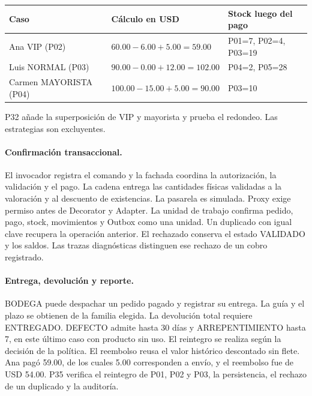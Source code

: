 \begin{center}\small
\begin{tabular}{@{}L{.22\linewidth}L{.42\linewidth}L{.30\linewidth}@{}}\toprule
Caso & Cálculo en USD & Stock luego del pago\\\midrule
Ana VIP (P02) & $60.00-6.00+5.00=59.00$ & P01=7, P02=4, P03=19\\
Luis NORMAL (P03) & $90.00-0.00+12.00=102.00$ & P04=2, P05=28\\
Carmen MAYORISTA (P04) & $100.00-15.00+5.00=90.00$ & P03=10\\\bottomrule
\end{tabular}
\end{center}
P32 añade la superposición de VIP y mayorista y prueba el redondeo. Las estrategias son excluyentes.

\paragraph{Confirmación transaccional.}
El invocador registra el comando y la fachada coordina la autorización, la validación y el pago. La cadena entrega las cantidades físicas validadas a la valoración y al descuento de existencias. La pasarela es simulada. Proxy exige permiso antes de Decorator y Adapter. La unidad de trabajo confirma pedido, pago, stock, movimientos y Outbox como una unidad. Un duplicado con igual clave recupera la operación anterior. El rechazado conserva el estado VALIDADO y los saldos. Las trazas diagnósticas distinguen ese rechazo de un cobro registrado.

\paragraph{Entrega, devolución y reporte.}
BODEGA puede despachar un pedido pagado y registrar su entrega. La guía y el plazo se obtienen de la familia elegida. La devolución total requiere ENTREGADO. DEFECTO admite hasta 30 días y ARREPENTIMIENTO hasta 7, en este último caso con producto sin uso. El reintegro se realiza según la decisión de la política. El reembolso reusa el valor histórico descontado sin flete. Ana pagó 59.00, de los cuales 5.00 corresponden a envío, y el reembolso fue de USD 54.00. P35 verifica el reintegro de P01, P02 y P03, la persistencia, el rechazo de un duplicado y la auditoría.

